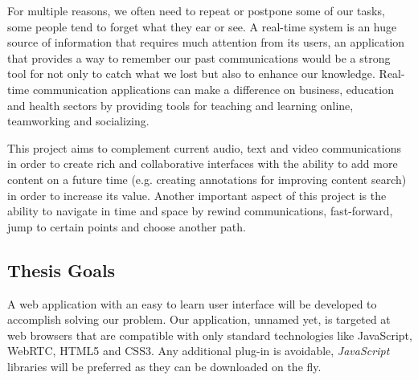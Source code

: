 	For multiple reasons, we often need to repeat or postpone some of our tasks, some people tend to forget what they ear or see.
        A real-time system is an huge source of information that requires much attention from its users, an application that provides a way to remember our past communications would be a strong tool for not only to catch what we lost but also to enhance our knowledge.
        Real-time communication applications can make a difference on business, education and health sectors by providing tools for teaching and learning online, teamworking and socializing.

	This project aims to complement current audio, text and video communications in order to create rich and collaborative interfaces with the ability to add more content on a future time (e.g. creating annotations for improving content search) in order to increase its value. Another important aspect of this project is the ability to navigate in time and space by rewind communications, fast-forward, jump to certain points and choose another path.




\subsection{Thesis Goals} %

A web application with an easy to learn user interface will be developed to accomplish solving our problem. Our application, unnamed yet, is targeted at web browsers that are compatible with only standard technologies like JavaScript, \ac{WebRTC}, \ac{HTML}5 and \ac{CSS}3. Any additional plug-in is avoidable, \emph{JavaScript} libraries will be preferred as they can be downloaded on the fly.  

